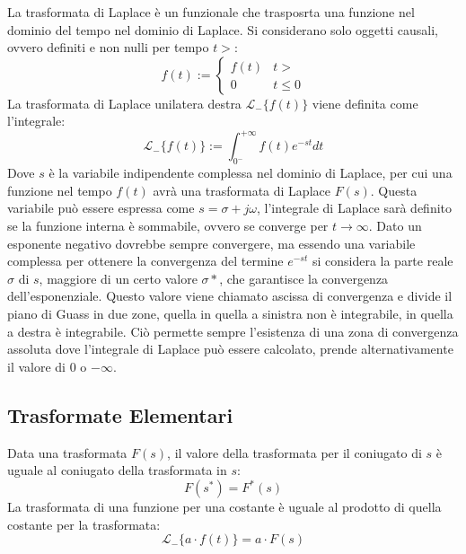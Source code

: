 \documentclass{article}
\numberwithin{equation}{subsection}
\begin{document}
La trasformata di Laplace è un funzionale che trasposrta una funzione nel dominio del tempo nel dominio di Laplace. Si considerano solo oggetti 
causali, ovvero definiti e non nulli per tempo $t>$:
\begin{equation}
    f(t):=
    \begin{cases}
        f(t) &t>\\
        0 &t\leq0
    \end{cases}
\end{equation}    
La trasformata di Laplace unilatera destra $\mathscr{L}_-\{f(t)\}$ viene definita come l'integrale: 
\begin{equation}
    \mathscr{L}_-\{f(t)\}:=\displaystyle\int_{0^-}^{+\infty}f(t)e^{-st}dt
\end{equation}
Dove $s$ è la variabile indipendente complessa nel dominio di Laplace, per cui una funzione nel tempo $f(t)$ avrà una trasformata di Laplace $F(s)$. 
Questa variabile può essere espressa come $s=\sigma+j\omega$, l'integrale di Laplace sarà definito se la funzione interna è sommabile, ovvero se converge per $t\to\infty$. 
Dato un esponente negativo dovrebbe sempre convergere, ma essendo una variabile complessa per ottenere la convergenza del termine $e^{-st}$ si considera la parte reale $\sigma$
di $s$, maggiore di un certo valore $\sigma*$, che garantisce la convergenza dell'esponenziale. Questo valore viene chiamato ascissa di convergenza e divide il piano di Guass 
in due zone, quella in quella a sinistra non è integrabile, in quella a destra è integrabile. Ciò permette sempre l'esistenza di una zona di convergenza assoluta dove l'integrale 
di Laplace può essere calcolato, prende alternativamente il valore di $0$ o $-\infty$. 

\begin{center}
\end{center}

\subsection{Trasformate Elementari}

Data una trasformata $F(s)$, il valore della trasformata per il coniugato di $s$ è uguale al coniugato della trasformata in $s$:
\begin{equation}
    F(s^*)=F^*(s)
\end{equation}
La trasformata di una funzione per una costante è uguale al prodotto di quella costante per la trasformata:
\begin{equation}
    \mathscr{L}_-\{a\cdot f(t)\}=a\cdot F(s)
\end{equation} 
\end{document}
